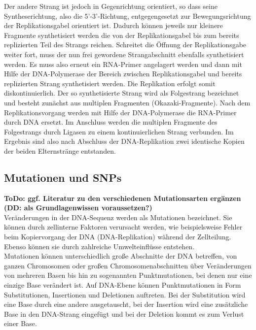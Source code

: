 Der andere Strang ist jedoch in Gegenrichtung orientiert, so dass seine Syntheserichtung, also die 5'-3'-Richtung, entgegengesetzt zur Bewegungsrichtung der Replikationsgabel orientiert ist. Dadurch können jeweils nur kleinere Fragmente synthetisiert werden die von der Replikationsgabel bis zum bereits replizierten Teil des Strangs reichen. Schreitet die Öffnung der Replikationsgabe weiter fort, muss der nun frei gewordene Strangabschnitt ebenfalls synthetisiert werden. Es muss also erneut ein RNA-Primer angelagert werden und dann mit Hilfe der DNA-Polymerase der Bereich zwischen Replikationsgabel und bereits replizierten Strang synthetisiert werden. Die Replikation erfolgt somit diskontinuierlich. Der so synthetisierte Strang wird als Folgestrang bezeichnet und besteht zunächst aus multiplen Fragmenten (Okazaki-Fragmente). Nach dem Replikationsvorgang werden mit Hilfe der DNA-Polymerase die RNA-Primer durch DNA ersetzt. Im Anschluss werden die multiplen Fragmente des Folgestrangs durch Ligasen zu einem kontinuierlichen Strang verbunden. Im Ergebnis sind also nach Abschluss der DNA-Replikation zwei identische Kopien der beiden Elternstränge entstanden.

\subsection{Mutationen und SNPs} \label{subsec:mutation}

\textbf{ToDo: ggf. Literatur zu den verschiedenen Mutationsarten ergänzen (DD: als Grundlagenwissen voraussetzen?)} \\
Veränderungen in der DNA-Sequenz werden als Mutationen bezeichnet. Sie können durch zellinterne Faktoren verursacht werden, wie beispielsweise Fehler beim Kopiervorgang der DNA (DNA-Replikation) während der Zellteilung. Ebenso können sie durch zahlreiche Umwelteinflüsse entstehen. \\

Mutationen können unterschiedlich große Abschnitte der DNA betreffen, von ganzen Chromosomen oder großen Chromosomenabschnitten über Veränderungen von mehreren Basen bis hin zu sogenannten Punktmutationen, bei denen nur eine einzige Base verändert ist. Auf DNA-Ebene können Punktmutationen in Form Substitutionen, Insertionen und Deletionen auftreten. Bei der Substitution wird eine Base durch eine andere ausgetauscht, bei der Insertion wird eine zusätzliche Base in den DNA-Strang eingefügt und bei der Deletion kommt es zum Verlust einer Base. \\

